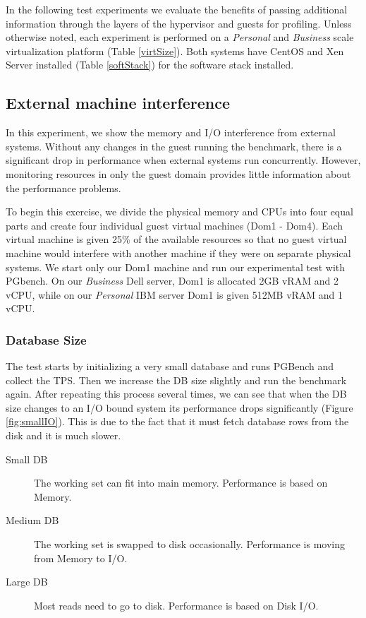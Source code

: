 In the following test experiments we evaluate the benefits of passing additional information through the layers of the hypervisor and guests for profiling.  Unless otherwise noted, each experiment is performed on a \emph{Personal} and \emph{Business} scale virtualization platform (Table \ref{virtSize}).  Both systems have CentOS and Xen Server installed (Table \ref{softStack}) for the software stack installed.

\subsection{External machine interference}
In this experiment, we show the memory and I/O interference from external systems.  
Without any changes in the guest running the benchmark, there is a significant drop in performance when external systems run concurrently.  
However, monitoring resources in only the guest domain provides little information about the performance problems. 

To begin this exercise, we divide the physical memory and CPUs into four equal parts and create four individual guest virtual machines (Dom1 - Dom4).  
Each virtual machine is given 25\% of the available resources so that no guest virtual machine would interfere with another machine if they were on separate physical systems.  
We start only our Dom1 machine and run our experimental test with PGbench.  
On our \emph{Business} Dell server, Dom1 is allocated 2GB vRAM and 2 vCPU, while on our \emph{Personal} IBM server Dom1 is given 512MB vRAM and 1 vCPU.  

\subsubsection{Database Size}
The test starts by initializing a very small database and runs PGBench and collect the TPS.  
Then we increase the DB size slightly and run the benchmark again.  
After repeating this process several times, we can see that when the DB size changes to an I/O bound system its performance drops significantly (Figure \ref{fig:smallIO}).  
This is due to the fact that it must fetch database rows from the disk and it is much slower.  

\begin{description}
  \item[Small DB] The working set can fit into main memory.  Performance is based on Memory.
  \item[Medium DB] The working set is swapped to disk occasionally. Performance is moving from Memory to I/O.
  \item[Large DB] Most reads need to go to disk.  Performance is based on Disk I/O.
\end{description}

